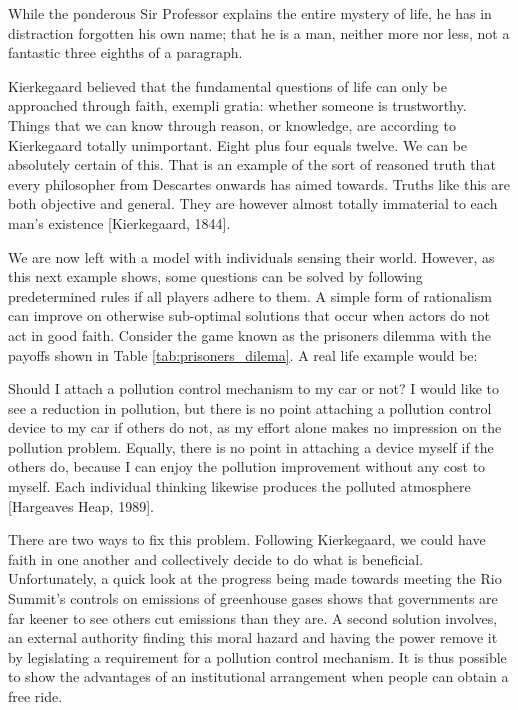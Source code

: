\begin{displayquote}
While the ponderous Sir Professor explains the entire mystery of life, he has in distraction forgotten his own name; that he is a man, neither more nor less, not a fantastic three eighths of a paragraph.
\end{displayquote}

Kierkegaard believed that the fundamental questions of life can only be approached through faith, exempli gratia: whether someone is trustworthy. Things that we can know through reason, or knowledge, are according to Kierkegaard totally unimportant. Eight plus four equals twelve. We can be absolutely certain of this. That is an example of the sort of reasoned truth that every philosopher from Descartes onwards has aimed towards. Truths like this are both objective and general. They are however almost totally immaterial to each man's existence [Kierkegaard, 1844].

We are now left with a model with individuals sensing their world. However, as this next example shows, some questions can be solved by following predetermined rules if all players adhere to them. A simple form of rationalism can improve on otherwise sub-optimal solutions that occur when actors do not act in good faith. Consider the game known as the prisoners dilemma with the payoffs shown in Table \ref{tab:prisoners_dilema}. A real life example would be:



\begin{displayquote}
Should I attach a pollution control mechanism to my car or not? I would like to see a reduction in pollution, but there is no point attaching a pollution control device to my car if others do not, as my effort alone makes no impression on the pollution problem. Equally, there is no point in attaching a device myself if the others do, because I can enjoy the pollution improvement without any cost to myself. Each individual thinking likewise produces the polluted atmosphere [Hargeaves Heap, 1989].
\end{displayquote}

There are two ways to fix this problem. Following Kierkegaard, we could have faith in one another and collectively decide to do what is beneficial. Unfortunately, a quick look at the progress being made towards meeting the Rio Summit's controls on emissions of greenhouse gases shows that governments are far keener to see others cut emissions than they are. A second solution involves, an external authority finding this moral hazard and having the power remove it by legislating a requirement for a pollution control mechanism. It is thus possible to show the advantages of an institutional arrangement when people can obtain a free ride.

